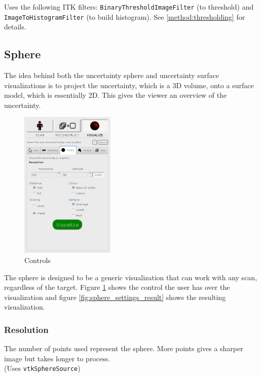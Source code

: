 Uses the following ITK filters: \texttt{BinaryThresholdImageFilter} (to threshold) and \\\texttt{ImageToHistogramFilter} (to build histogram). See \ref{method:thresholding} for details.


\clearpage
\subsection{Sphere}\label{implementation:sphere}
The idea behind both the uncertainty sphere and uncertainty surface visualizations is to project the uncertainty, which is a 3D volume, onto a surface model, which is essentially 2D. This gives the viewer an overview of the uncertainty.

\begin{figure}
  \vspace{-20pt}
  \includegraphics[width=0.4\textwidth]{images/tool/3_sphere.png}
  \caption{Controls}\label{fig:sphere_settings}
\end{figure}

The sphere is designed to be a generic visualization that can work with any scan, regardless of the target. Figure \ref{fig:sphere_settings} shows the control the user has over the visualization and figure \ref{fig:sphere_settings_result} shows the resulting visualization.

\subsubsection{Resolution}
The number of points used represent the sphere. More points gives a sharper image but takes longer to process.\\(Uses \texttt{vtkSphereSource})

